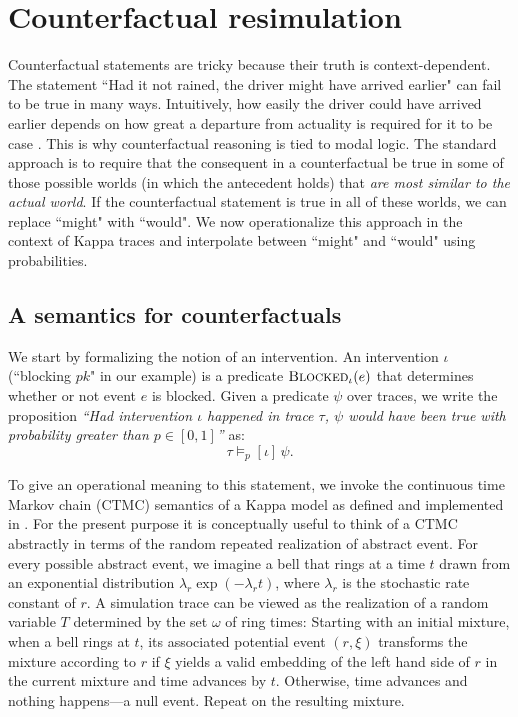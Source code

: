 \section{Counterfactual resimulation}\label{sec:counterfactual}

Counterfactual statements are tricky because their truth is
context-dependent. The statement ``Had it not rained, the driver might
have arrived earlier" can fail to be true in many ways. Intuitively,
how easily the driver could have arrived earlier depends on how great
a departure from actuality is required for it to be case
\cite{Lewis1973}. This is why counterfactual reasoning is tied to
modal logic. The standard approach is to require that the consequent
in a counterfactual be true in some of those possible worlds (in which
the antecedent holds) that \textit{are most similar to the actual
  world}. If the counterfactual statement is true in all of these
worlds, we can replace ``might" with ``would".  We now operationalize
this approach in the context of Kappa traces and interpolate between
``might" and ``would" using probabilities.

\subsection{A semantics for counterfactuals}

We start by formalizing the notion of an intervention. An intervention
$\iota$ (``blocking $pk$" in our example) is a predicate
${\textsc{Blocked}}_{\iota}(e)$ that determines whether or not event $e$ is
blocked. Given a predicate $\psi$ over traces, we write
the proposition \textit{``Had intervention $\iota$ happened in trace
  $\tau$, $\psi$ would have been true with probability greater than
  $p \in [0,1]$''} as:
\[ \tau \models_p [\iota] \, \psi.
\]

To give an operational meaning to this statement, we invoke the
continuous time Markov chain (CTMC) semantics of a Kappa model as
defined and implemented in
\cite{DanosEtAl-APLAS07,BoutillierEK17}. For the present purpose it is
conceptually useful to think of a CTMC abstractly in terms of the
random repeated realization of abstract event. For every possible
abstract event, we imagine a bell that rings at a time $t$ drawn from
an exponential distribution $\lambda_r\exp(-\lambda_r t)$, where
$\lambda_r$ is the stochastic rate constant of $r$. A simulation trace
can be viewed as the realization of a random variable $T$ determined
by the set $\omega$ of ring times: Starting with an initial mixture,
when a bell rings at $t$, its associated potential event $(r, \xi)$
transforms the mixture according to $r$ if $\xi$ yields a valid
embedding of the left hand side of $r$ in the current mixture and time
advances by $t$. Otherwise, time advances and nothing happens---a null
event. Repeat on the resulting mixture.

